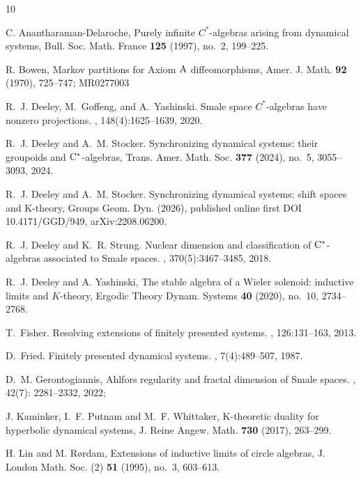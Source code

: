 \documentclass{amsart}
\theoremstyle{plain}
\theoremstyle{definition}
\theoremstyle{remark}
\begin{document}
\begin{thebibliography}{10}


C. Anantharaman-Delaroche, Purely infinite $C^*$-algebras arising from dynamical systems, Bull. Soc. Math. France {\bf 125} (1997), no.~2, 199--225.


R. Bowen, Markov partitions for Axiom ${\rm A}$ diffeomorphisms, Amer. J. Math. {\bf 92} (1970), 725--747; MR0277003

R.~J. Deeley, M.~Goffeng, and A.~Yashinski.
\newblock Smale space {$C^*$}-algebras have nonzero projections.
, 148(4):1625--1639, 2020.

R.~J. Deeley and A.~M. Stocker. \newblock Synchronizing dynamical systems: their groupoids and {$\rm C^*$}-algebras, Trans. Amer. Math. Soc. {\bf 377} (2024), no.~5, 3055--3093, 2024.

R.~J. Deeley and A.~M. Stocker. \newblock Synchronizing dynamical systems: shift spaces and K-theory, Groups Geom. Dyn. (2026), published online first DOI 10.4171/GGD/949, arXiv:2208.06200.

R.~J. Deeley and K.~R. Strung.
\newblock Nuclear dimension and classification of {$\rm C^*$}-algebras
  associated to {S}male spaces.
, 370(5):3467--3485, 2018.

R.~J. Deeley and A. Yashinski, The stable algebra of a Wieler solenoid: inductive limits and $K$-theory, Ergodic Theory Dynam. Systems {\bf 40} (2020), no.~10, 2734--2768.


T.~Fisher.
\newblock Resolving extensions of finitely presented systems.
, 126:131--163, 2013.

D.~Fried.
\newblock Finitely presented dynamical systems.
, 7(4):489–507, 1987.

D.~M. Gerontogiannis, Ahlfors regularity and fractal dimension of Smale spaces. , 42(7): 2281--2332, 2022;



J. Kaminker, I.~F. Putnam and M.~F. Whittaker, K-theoretic duality for hyperbolic dynamical systems, J. Reine Angew. Math. {\bf 730} (2017), 263--299.


H. Lin and M. R\o rdam, Extensions of inductive limits of circle algebras, J. London Math. Soc. (2) {\bf 51} (1995), no.~3, 603--613.



\end{thebibliography}
\end{document}
